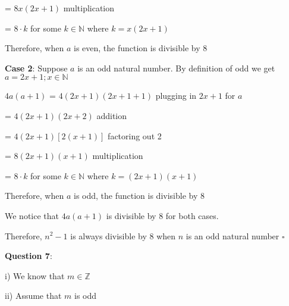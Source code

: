 \documentclass{article} %
\newcommand{\question}[2][]{\begin{flushleft}
        \textbf{Question #1}: \textit{#2}

\end{flushleft}}
\begin{document}
    \tabto*{2.08cm} = $8x(2x + 1)$ \tabto*{5cm}multiplication

    \tabto*{2.08cm} = $8\cdot k$ for some $k \in \mathbb{N}$ where $k = x(2x + 1)$


    Therefore, when $a$ is even, the function is divisible by 8

    \vspace*{0.2cm}

    \textbf{Case 2}: Suppose $a$ is an odd natural number. By definition of odd we get $a = 2x + 1; x \in \mathbb{N}$

    $4a(a + 1)$ = $4(2x + 1)(2x + 1+ 1)$ \tabto*{6cm}plugging in $2x + 1$ for $a$

    \tabto*{2.08cm} = $4(2x + 1)(2x + 2)$ \tabto*{6cm}addition

    \tabto*{2.08cm} = $4(2x + 1)[2(x + 1)]$ \tabto*{6cm}factoring out 2

    \tabto*{2.08cm} = $8(2x + 1)(x + 1)$ \tabto*{6cm}multiplication

    \tabto*{2.08cm} = $8\cdot k$ for some $k \in \mathbb{N}$ where $k = (2x + 1)(x + 1)$


    Therefore, when $a$ is odd, the function is divisible by 8

    \vspace*{0.3cm}

    We notice that $4a(a+1)$ is divisible by 8 for both cases.

    Therefore, $n^2 -1$ is always divisible by 8 when $n$ is an odd natural number $\square$

                                                                     
    \question[7]{}

    i) We know that $m \in \mathbb{Z}$

    ii) Assume that $m$ is odd
\end{document}
